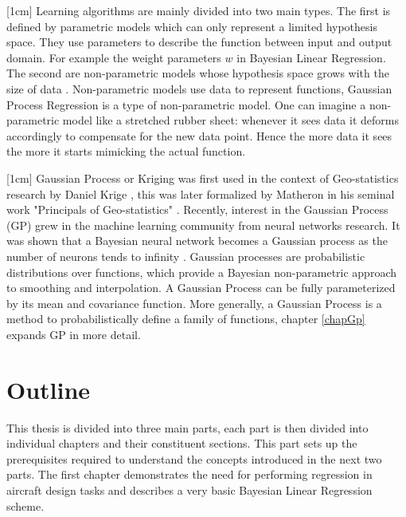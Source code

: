 [1cm]
Learning algorithms are mainly divided into two main types. The first is defined by parametric models which can only represent a limited hypothesis space. They use parameters to describe the function between input and output domain. For example the weight parameters $w$ in Bayesian Linear Regression. The second are non-parametric models whose hypothesis space grows with the size of data \cite{ghahramani2013bayesian}. Non-parametric models use data to represent functions, Gaussian Process Regression is a type of non-parametric model. One can imagine a non-parametric model like a stretched rubber sheet: whenever it sees data it deforms accordingly to compensate for the new data point. Hence the more data it sees the more it starts mimicking the actual function. 

[1cm]
Gaussian Process or Kriging was first used in the context of Geo-statistics research by Daniel Krige \cite{krige1951statistical}, this was later formalized by Matheron in his seminal work "Principals of Geo-statistics" \cite{matheron1963principles}. Recently, interest in the Gaussian Process (GP) grew in the machine learning community from neural networks research. It was shown that a Bayesian neural network becomes a Gaussian process as the number of neurons tends to infinity \cite{neal2012bayesian}. Gaussian processes are probabilistic distributions over functions, which provide a Bayesian non-parametric approach to smoothing and interpolation. A Gaussian Process can be fully parameterized by its mean and covariance function. More generally, a Gaussian Process is a method to probabilistically define a family of functions, chapter \ref{chapGp} expands GP in more detail. 

\section{Outline}\label{secOutline}
This thesis is divided into three main parts, each part is then divided into individual chapters and their constituent sections. This part sets up the prerequisites required to understand the concepts introduced in the next two parts. The first chapter demonstrates the need for performing regression in aircraft design tasks and describes a very basic Bayesian Linear Regression scheme. 

